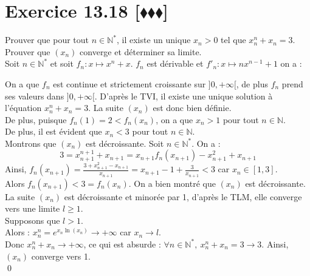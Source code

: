\documentclass[10pt]{article}
\begin{document}
\section*{Exercice 13.18 [$\blacklozenge\blacklozenge\blacklozenge$]}
\begin{tcolorbox}[enhanced, width=7.6in, center, size=fbox, fontupper=\large, drop shadow southwest]
    Prouver que pour tout $n\in\mathbb{N}^*$, il existe un unique $x_n>0$ tel que $x^n_n + x_n = 3$. Prouver que $(x_n)$ converge et déterminer sa limite.\\
    Soit $n\in\mathbb{N}^*$ et soit $f_n : x\mapsto x^n + x$. $f_n$ est dérivable et $f'_n: x \mapsto nx^{n-1} + 1$ on a :
    \begin{center}
    \end{center}
    On a que $f_n$ est continue et strictement croissante sur $]0, +\infty[$, de plus $f_n$ prend ses valeurs dans $]0, +\infty[$. D'après le TVI, il existe une unique solution à l'équation $x_n^n +x_n = 3$. La suite $(x_n)$ est donc bien définie.\\
    De plus, puisque $f_n(1)=2<f_n(x_n)$, on a que $x_n>1$ pour tout $n\in\mathbb{N}$.\\
    De plus, il est évident que $x_n<3$ pour tout $n\in\mathbb{N}$.\\
    Montrons que $(x_n)$ est décroissante. Soit $n\in\mathbb{N}^*$. On a :
    \begin{equation*}
        3 = x^{n+1}_{n+1}+x_{n+1} = x_{n+1}f_n(x_{n+1}) - x_{n+1}^2 + x_{n+1}
    \end{equation*}
    Ainsi, $f_n(x_{n+1})=\frac{3 +x_{n+1}^2  - x_{n+1}}{x_{n+1}}=x_{n+1} - 1 + \frac{3}{x_{n+1}}<3$ car $x_n\in[1,3]$.\\
    Alors $f_n(x_{n+1})<3=f_n(x_n)$. On a bien montré que $(x_n)$ est décroissante.\\
    La suite $(x_n)$ est décroissante et minorée par 1, d'après le TLM, elle converge vers une limite $l\geq1$.\\
    Supposons que $l>1$.\\
    Alors : $x_n^n = e^{x_n\ln(x_n)} \to +\infty$ car $x_n \to l$.\\
    Donc $x_n^n + x_n \to +\infty$, ce qui est absurde : $\forall n \in \mathbb{N}^*, ~ x_n^n + x_n = 3 \to 3$.
    Ainsi, $(x_n)$ converge vers 1.\\
    \qed
\end{tcolorbox}
\end{document}
